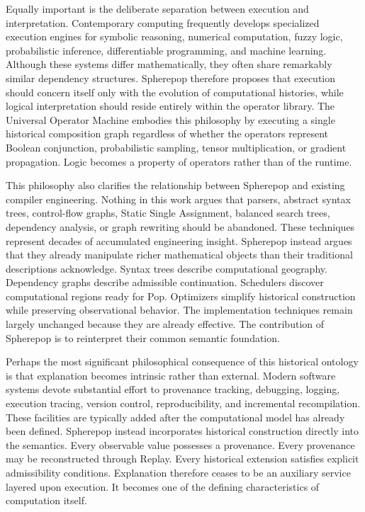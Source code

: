\documentclass[12pt,oneside]{article}
\theoremstyle{definition}
\theoremstyle{remark}
\begin{document}
Equally important is the deliberate separation between execution and
interpretation. Contemporary computing frequently develops specialized
execution engines for symbolic reasoning, numerical computation, fuzzy logic,
probabilistic inference, differentiable programming, and machine learning.
Although these systems differ mathematically, they often share remarkably
similar dependency structures. Spherepop therefore proposes that execution
should concern itself only with the evolution of computational histories,
while logical interpretation should reside entirely within the operator
library. The Universal Operator Machine embodies this philosophy by executing
a single historical composition graph regardless of whether the operators
represent Boolean conjunction, probabilistic sampling, tensor multiplication,
or gradient propagation. Logic becomes a property of operators rather than of
the runtime.

This philosophy also clarifies the relationship between Spherepop and existing
compiler engineering. Nothing in this work argues that parsers, abstract syntax
trees, control-flow graphs, Static Single Assignment, balanced search trees,
dependency analysis, or graph rewriting should be abandoned. These techniques
represent decades of accumulated engineering insight. Spherepop instead argues
that they already manipulate richer mathematical objects than their traditional
descriptions acknowledge. Syntax trees describe computational geography.
Dependency graphs describe admissible continuation. Schedulers discover
computational regions ready for Pop. Optimizers simplify historical
construction while preserving observational behavior. The implementation
techniques remain largely unchanged because they are already effective. The
contribution of Spherepop is to reinterpret their common semantic foundation.

Perhaps the most significant philosophical consequence of this historical
ontology is that explanation becomes intrinsic rather than external. Modern
software systems devote substantial effort to provenance tracking, debugging,
logging, execution tracing, version control, reproducibility, and incremental
recompilation. These facilities are typically added after the computational
model has already been defined. Spherepop instead incorporates historical
construction directly into the semantics. Every observable value possesses a
provenance. Every provenance may be reconstructed through Replay. Every
historical extension satisfies explicit admissibility conditions. Explanation
therefore ceases to be an auxiliary service layered upon execution. It becomes
one of the defining characteristics of computation itself.
\end{document}
